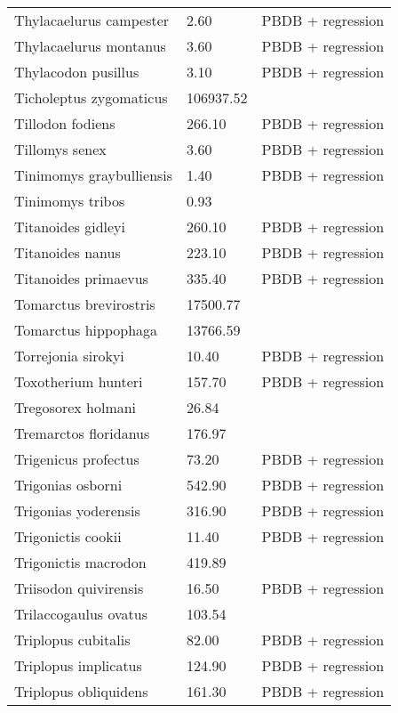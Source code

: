 \documentclass{article}
\begin{document}
\begin{center}
\begin{longtable}{p{} p{} p{}}
    Thylacaelurus campester & 2.60 & PBDB + regression \\ 
    Thylacaelurus montanus & 3.60 & PBDB + regression \\ 
    Thylacodon pusillus & 3.10 & PBDB + regression \\ 
    Ticholeptus zygomaticus & 106937.52 & \cite{Tomiya2013} \\ 
    Tillodon fodiens & 266.10 & PBDB + regression \\ 
    Tillomys senex & 3.60 & PBDB + regression \\ 
    Tinimomys graybulliensis & 1.40 & PBDB + regression \\ 
    Tinimomys tribos & 0.93 & \cite{Skinner1972} \\ 
    Titanoides gidleyi & 260.10 & PBDB + regression \\ 
    Titanoides nanus & 223.10 & PBDB + regression \\ 
    Titanoides primaevus & 335.40 & PBDB + regression \\ 
    Tomarctus brevirostris & 17500.77 & \cite{Tomiya2013} \\ 
    Tomarctus hippophaga & 13766.59 & \cite{Tomiya2013} \\ 
    Torrejonia sirokyi & 10.40 & PBDB + regression \\ 
    Toxotherium hunteri & 157.70 & PBDB + regression \\ 
    Tregosorex holmani & 26.84 & \cite{Tomiya2013} \\ 
    Tremarctos floridanus & 176.97 & \cite{Smith2004} \\ 
    Trigenicus profectus & 73.20 & PBDB + regression \\ 
    Trigonias osborni & 542.90 & PBDB + regression \\ 
    Trigonias yoderensis & 316.90 & PBDB + regression \\ 
    Trigonictis cookii & 11.40 & PBDB + regression \\ 
    Trigonictis macrodon & 419.89 & \cite{Tomiya2013} \\ 
    Triisodon quivirensis & 16.50 & PBDB + regression \\ 
    Trilaccogaulus ovatus & 103.54 & \cite{Tomiya2013} \\ 
    Triplopus cubitalis & 82.00 & PBDB + regression \\ 
    Triplopus implicatus & 124.90 & PBDB + regression \\ 
    Triplopus obliquidens & 161.30 & PBDB + regression \\ 

\end{longtable}
\end{center}
\end{document}
